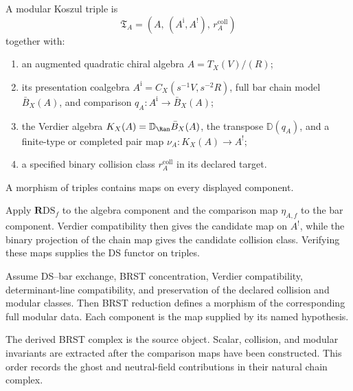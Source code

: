 \begin{definition}
\label{def:modular-koszul-triple}
\ClaimStatusDefinitional
A modular Koszul triple is
\[
\mathfrak T_A=
\left(A,\,(A^{\mathrm i},A^!),\,r_A^{\mathrm{coll}}\right)
\]
together with:
\begin{enumerate}[label=\textup{(\roman*)}]
\item an augmented quadratic chiral algebra
  \(A=T_X(V)/(R)\);
\item its presentation coalgebra
  \(A^{\mathrm i}=C_X(s^{-1}V,s^{-2}R)\), full bar chain model
  \(\bar B_X(A)\), and comparison
  \(q_A\colon A^{\mathrm i}\to\bar B_X(A)\);
\item the Verdier algebra
  \(K_X(A)=\mathbb D_{\Ran}\bar B_X(A)\), the transpose
  \(\mathbb D(q_A)\), and a finite-type or completed pair map
  \(\nu_A\colon K_X(A)\to A^!\);
\item a specified binary collision class
  \(r_A^{\mathrm{coll}}\) in its declared target.
\end{enumerate}
A morphism of triples contains maps on every displayed component.
\end{definition}

\begin{construction}
\label{constr:ds-functor-triples}
\ClaimStatusOpen
Apply \(\mathbf R\mathrm{DS}_f\) to the algebra component and the
comparison map \(\eta_{A,f}\) to the bar component.  Verdier
compatibility then gives the candidate map on \(A^!\), while the
binary projection of the chain map gives the candidate collision
class.  Verifying these maps supplies the DS functor on triples.
\end{construction}

\begin{theorem}
\label{thm:ds-platonic-functor}
\ClaimStatusConditional
Assume DS--bar exchange, BRST concentration, Verdier compatibility,
determinant-line compatibility, and preservation of the declared
collision and modular classes.  Then BRST reduction defines a
morphism of the corresponding full modular data.  Each component is
the map supplied by its named hypothesis.
\end{theorem}

\begin{remark}
\label{rem:ds-before-shadows}
The derived BRST complex is the source object.  Scalar, collision,
and modular invariants are extracted after the comparison maps have
been constructed.  This order records the ghost and neutral-field
contributions in their natural chain complex.
\end{remark}

